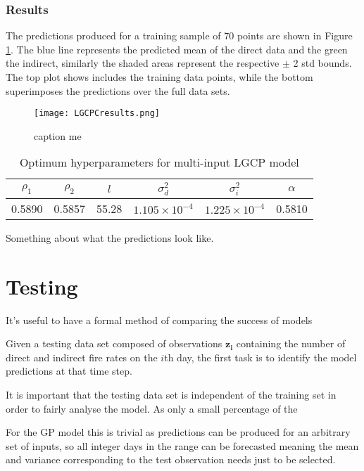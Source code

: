 \documentclass[a4paper,11pt]{report}
\begin{document}
\subsection{Results}
The predictions produced for a training sample of 70 points are shown in Figure \ref{fig:LGCPCresults}. The blue line represents the predicted mean of the direct data and the green the indirect, similarly the shaded areas represent the respective \(\pm\) 2 std bounds. The top plot shows includes the training data points, while the bottom superimposes the predictions over the full data sets. \par

\begin{figure}
\centering
\texttt{[image: LGCPCresults.png]}
\caption{caption me}
\label{fig:LGCPCresults}
\end{figure}

\begin{table}[]
\centering
\caption{Optimum hyperparameters for multi-input LGCP model}
\label{LGCPChyper}
\begin{tabular}{|c|c|c|c|c|c|}
\hline
\multicolumn{1}{|c|}{\(\rho_1\)} & \multicolumn{1}{c|}{\(\rho_2\)} & \(l\)                      & \(\sigma_d^2\)            & \(\sigma_i^2\)            & \(\alpha\) \\ \hline
0.5890                            & 0.5857                           & \multicolumn{1}{c|}{55.28} & \(1.105 \times 10^{-4}\) & \(1.225 \times 10^{-4}\) & 0.5810     \\ \hline
\end{tabular}
\end{table}

Something about what the predictions look like. 

\chapter{Testing}
It's useful to have a formal method of comparing the success of models

Given a testing data set composed of observations \(\mathbf{z_i}\) containing the number of direct and indirect fire rates on the \(i\)th day, the first task is to identify the model predictions at that time step.

It is important that the testing data set is independent of the training set in order to fairly analyse the model. As only a small percentage of the 

For the GP model this is trivial as predictions can be produced for an arbitrary set of inputs, so all integer days in the range can be forecasted meaning the mean and variance corresponding to the test observation needs just to be selected. 
\end{document}
